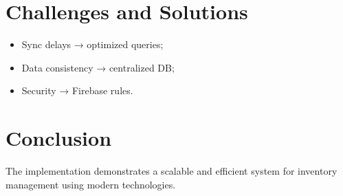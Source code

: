 \section{Challenges and Solutions}

\begin{itemize}
    \item Sync delays → optimized queries;
    \item Data consistency → centralized DB;
    \item Security → Firebase rules.
\end{itemize}

\section{Conclusion}

The implementation demonstrates a scalable and efficient system for inventory management using modern technologies.